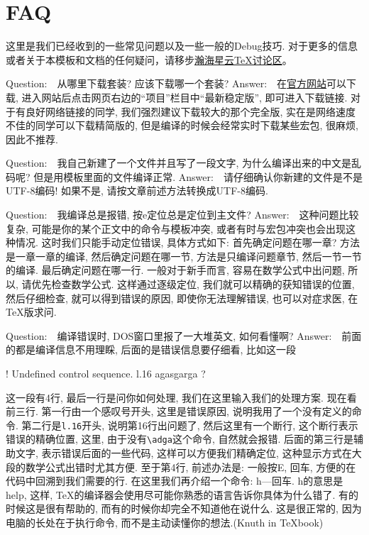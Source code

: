 ﻿\def\Q{\noindent Question:~~}
\def\A{\newline Answer:~~}
\chapter{FAQ}
\label{chap:contact}

这里是我们已经收到的一些常见问题以及一些一般的Debug技巧. 对于更多的信息或者关于本模板和文档的任何疑问，请移步\href{http://bbs.ustc.edu.cn/cgi/bbsdoc?board=TeX}{瀚海星云\TeX{}讨论区}。

\Q 从哪里下载\CTeX{}套装? 应该下载哪一个\CTeX{}套装?
\A 在\href{http://www.ctex.org}{\CTeX{}官方网站}可以下载, 进入网站后点击网页右边的``项目''栏目中``最新稳定版'', 即可进入下载链接. 对于有良好网络链接的同学, 我们强烈建议下载较大的那个完全版, 实在是网络速度不佳的同学可以下载精简版的, 但是编译的时候会经常实时下载某些宏包, 很麻烦, 因此不推荐.

\Q 我自己新建了一个文件并且写了一段文字, 为什么编译出来的中文是乱码呢? 但是用模板里面的文件编译正常.
\A 请仔细确认你新建的文件是不是UTF-8编码! 如果不是, 请按文章前述方法转换成UTF-8编码.

\Q 我编译总是报错, 按e定位总是定位到主文件?
\A 这种问题比较复杂, 可能是你的某个正文中的命令与模板冲突, 或者有时与宏包冲突也会出现这种情况. 这时我们只能手动定位错误, 具体方式如下: 首先确定问题在哪一章? 方法是一章一章的编译, 然后确定问题在哪一节, 方法是只编译问题章节, 然后一节一节的编译. 最后确定问题在哪一行. 一般对于新手而言, 容易在数学公式中出问题, 所以, 请优先检查数学公式. 这样通过逐级定位, 我们就可以精确的获知错误的位置, 然后仔细检查, 就可以得到错误的原因, 即使你无法理解错误, 也可以对症求医, 在\TeX{}版求问.

\Q 编译错误时, DOS窗口里报了一大堆英文, 如何看懂啊?
\A 前面的都是编译信息不用理睬, 后面的是错误信息要仔细看, 比如这一段
\begin{code}
  ! Undefined control sequence.
l.16 \adga
           agasgarga
?
\end{code}
这一段有4行, 最后一行是问你如何处理, 我们在这里输入我们的处理方案. 现在看前三行. 第一行由一个感叹号开头, 这里是错误原因, 说明我用了一个没有定义的命令.
第二行是\verb|l.16|开头, 说明第16行出问题了, 然后这里有一个断行, 这个断行表示错误的精确位置, 这里, 由于没有\verb|\adga|这个命令, 自然就会报错.
后面的第三行是辅助文字, 表示错误后面的一些代码, 这样可以方便我们精确定位, 这种显示方式在大段的数学公式出错时尤其方便. 至于第4行, 前述办法是: 一般按E, 回车, 方便的在代码中回溯到我们需要的行. 在这里我们再介绍一个命令: h---回车. h的意思是help, 这样, \TeX{}的编译器会使用尽可能你熟悉的语言告诉你具体为什么错了. 有的时候这是很有帮助的, 而有的时候你却完全不知道他在说什么. 这是很正常的, 因为电脑的长处在于执行命令, 而不是主动读懂你的想法.(Knuth in TeXbook)

